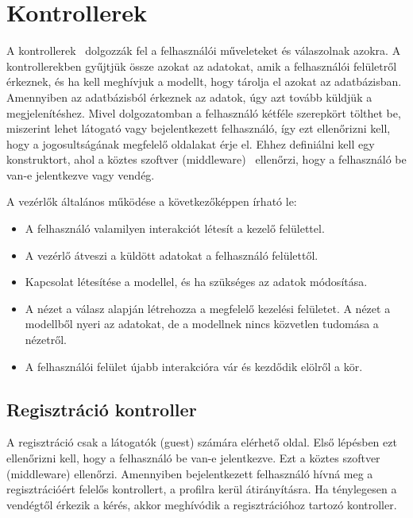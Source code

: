 \documentclass[
]{thesis-ekf}
\theoremstyle{definition}
\theoremstyle{remark}
\begin{document}
	
	
	\section{Kontrollerek}
	A kontrollerek~\cite{laravel_controller} dolgozzák fel a felhasználói műveleteket és válaszolnak azokra. A kontrollerekben gyűjtjük össze azokat az adatokat, amik a felhasználói felületről érkeznek, és ha kell meghívjuk a modellt, hogy tárolja el azokat az adatbázisban. Amennyiben az adatbázisból érkeznek az adatok, úgy azt tovább küldjük a megjelenítéshez. Mivel dolgozatomban a felhasználó kétféle szerepkört tölthet be, miszerint lehet látogató vagy bejelentkezett felhasználó, így ezt ellenőrizni kell, hogy a jogosultságának megfelelő oldalakat érje el. Ehhez definiálni kell egy konstruktort, ahol a köztes szoftver (middleware)~\cite{laravel_middleware} ellenőrzi, hogy a felhasználó be van-e jelentkezve vagy vendég.
	
	A vezérlők általános működése a következőképpen írható le:
	\begin{itemize}
		\item{A felhasználó valamilyen interakciót létesít a kezelő felülettel.}
		\item{A vezérlő átveszi a küldött adatokat a felhasználó felülettől.}
		\item{Kapcsolat létesítése a modellel, és ha szükséges az adatok módosítása.}
		\item{ A nézet a válasz alapján létrehozza a megfelelő kezelési felületet. A nézet a modellből nyeri az adatokat, de a modellnek nincs közvetlen tudomása a nézetről.}
		\item{A felhasználói felület újabb interakcióra vár és kezdődik elölről a kör.}~\cite{controller_cicle}
	\end{itemize}
	
	\subsection{Regisztráció kontroller}
	A regisztráció csak a látogatók (guest) számára elérhető oldal. Első lépésben ezt ellenőrizni kell, hogy a felhasználó be van-e jelentkezve. Ezt a köztes szoftver (middleware) ellenőrzi. Amennyiben bejelentkezett felhasználó hívná meg a regisztrációért felelős kontrollert, a profilra kerül átirányításra. Ha ténylegesen a vendégtől érkezik a kérés, akkor meghívódik a regisztrációhoz tartozó kontroller.  
	
\end{document}

